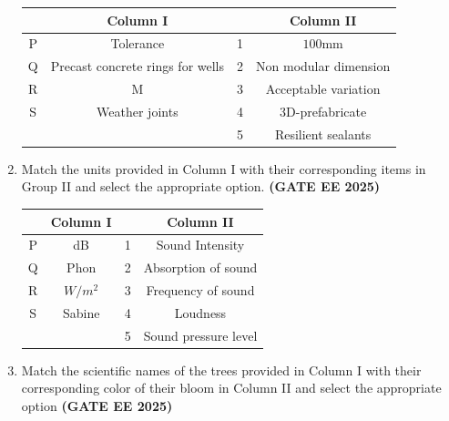 \documentclass[journal,12pt,onecolumn]{IEEEtran}
\theoremstyle{remark}
\begin{document}
\begin{enumerate}
\begin{tabular}{|c|c|c|c|}
  & Column I & & Column II \\ \hline
P &Tolerance &1 & $100\text{mm}$  \\ \hline
Q &Precast concrete rings for wells &2 &Non modular dimension \\ \hline
R & M & 3 & Acceptable variation\\ \hline
S & Weather joints &4 &3D-prefabricate\\ \hline
 &  & 5 & Resilient sealants\\ \hline
 \end{tabular}
 \begin{enumerate}
 \end{enumerate}
 \item Match the units provided in Column I with their corresponding items in Group II and select the appropriate option. \hfill \textbf{(GATE EE 2025)}\\
 \begin{tabular}{|c|c|c|c|} \hline
  & Column I & & Column II \\ \hline
P &dB&1 & Sound Intensity  \\ \hline
 Q &Phon&2&Absorption of sound\\ \hline
 R &$W/m^2$ & 3&Frequency of sound\\ \hline
 S&Sabine &4 &Loudness\\ \hline
  &   & 5 & Sound pressure level\\ \hline
 \end{tabular}
 \begin{enumerate}
 \end{enumerate}
 \item Match the scientific names of the trees provided in Column I with their corresponding color of their bloom in Column II and select the appropriate option \hfill \textbf{(GATE EE 2025)}

\end{enumerate}
\end{document}
